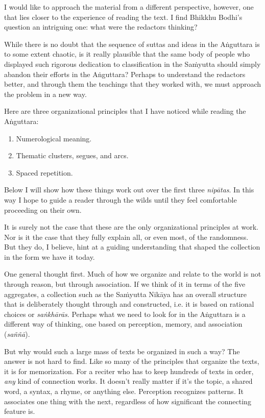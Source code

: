 \documentclass[12pt,openany]{book}%
\begin{document}
I would like to approach the material from a different perspective, however, one that lies closer to the experience of reading the text. I find Bhikkhu Bodhi’s question an intriguing one: what were the redactors thinking?

While there is no doubt that the sequence of suttas and ideas in the \textsanskrit{Aṅguttara} is to some extent chaotic, is it really plausible that the same body of people who displayed such rigorous dedication to classification in the \textsanskrit{Saṁyutta} should simply abandon their efforts in the \textsanskrit{Aṅguttara}? Perhaps to understand the redactors better, and through them the teachings that they worked with, we must approach the problem in a new way.

Here are three organizational principles that I have noticed while reading the \textsanskrit{Aṅguttara}:

\begin{enumerate}%
\item Numerological meaning.%
\item Thematic clusters, segues, and arcs.%
\item Spaced repetition.%
\end{enumerate}

Below I will show how these things work out over the first three \textit{\textsanskrit{nipātas}}. In this way I hope to guide a reader through the wilds until they feel comfortable proceeding on their own.

It is surely not the case that these are the only organizational principles at work. Nor is it the case that they fully explain all, or even most, of the randomness. But they do, I believe, hint at a guiding understanding that shaped the collection in the form we have it today.

One general thought first. Much of how we organize and relate to the world is not through reason, but through association. If we think of it in terms of the five aggregates, a collection such as the \textsanskrit{Saṁyutta} \textsanskrit{Nikāya} has an overall structure that is deliberately thought through and constructed, i.e. it is based on rational choices or \textit{\textsanskrit{saṅkhārās}}. Perhaps what we need to look for in the \textsanskrit{Aṅguttara} is a different way of thinking, one based on perception, memory, and association (\textit{\textsanskrit{saññā}}).

But why would such a large mass of texts be organized in such a way? The answer is not hard to find. Like so many of the principles that organize the texts, it is for memorization. For a reciter who has to keep hundreds of texts in order, \emph{any} kind of connection works. It doesn’t really matter if it’s the topic, a shared word, a syntax, a rhyme, or anything else. Perception recognizes patterns. It associates one thing with the next, regardless of how significant the connecting feature is.
\end{document}
